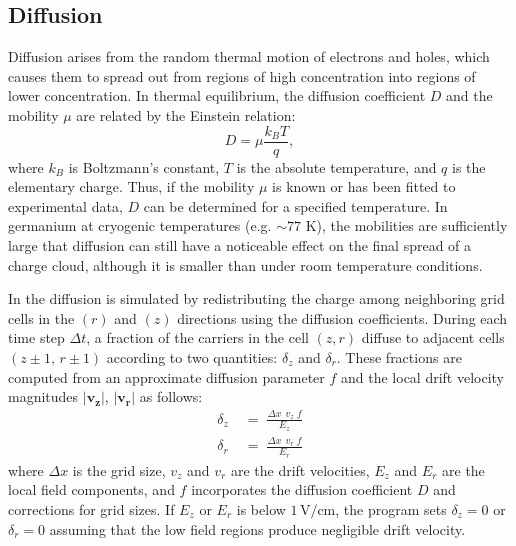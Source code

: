 \subsection{Diffusion}
Diffusion arises from the random thermal motion of electrons and holes, which causes them to spread out from regions of high concentration into regions of lower concentration. In thermal equilibrium, the diffusion coefficient $D$ and the mobility $\mu$
are related by the Einstein relation:
\begin{equation}
D = \mu \frac{k_B T}{q},
\end{equation}
where $k_B$ is Boltzmann's constant, $T$ is the absolute temperature, and $q$ is the elementary charge. Thus, if the mobility $\mu$ is known or has been fitted to experimental data, $D$ can be determined for a specified temperature. In germanium at cryogenic temperatures (e.g. $\sim 77$ K), the mobilities are
sufficiently large that diffusion can still have a noticeable effect on the final spread of a charge cloud, although it is smaller than under room temperature conditions.

In {\ehd} the diffusion is simulated by redistributing the charge among neighboring grid cells in the $(r)$ and $(z)$ directions using the diffusion coefficients. During each time step $\Delta t$, a fraction of the carriers in the cell $(z,r)$ diffuse to adjacent cells $(z\pm1,\,r\pm1)$ according to two quantities: $\delta_z$ and $\delta_r$. These fractions are computed from an approximate diffusion parameter $f$ and the local drift velocity magnitudes $\lvert \mathbf{v_z} \rvert$, $\lvert \mathbf{v_r} \rvert$ as follows:
\begin{align}
   \delta_z &\;=\; \frac{\Delta x \;\,v_z \;f}{E_z}\label{eq:deltaez}\\
   \delta_r &\;=\; \frac{\Delta x \;\,v_r \;f}{E_r} \label{eq:deltaer}
\end{align}
where $\Delta x$ is the grid size, $v_{z}$ and $v_{r}$ are the drift velocities, $E_{z}$ and $E_{r}$ are the local field components, and $f$ incorporates the diffusion coefficient $D$ and corrections for grid sizes. If $E_z$ or $E_r$ is below $1\,\mathrm{V/cm}$, the program sets $\delta_z = 0$ or $\delta_r=0$ assuming that the low field regions produce negligible drift velocity.

